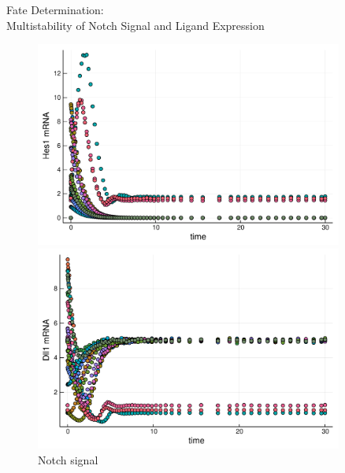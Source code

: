 \documentclass[xelatex]{beamer}
\newlength{\sepwidth}
\newlength{\colwidth}
\newcommand{\separatorcolumn}{\begin{column}{\sepwidth}\end{column}}
\begin{document}
\begin{frame}[t]
\begin{columns}[t]
\begin{column}{\colwidth}
\end{column}

\separatorcolumn

\begin{column}{\colwidth}

\begin{alertblock}{Fate Determination: \\ Multistability of Notch Signal and Ligand Expression}

	\begin{figure}
		\centering
		\footnotesize
		\begin{minipage}{0.4\textwidth}
			\includegraphics[scale=0.7]{Image/hes1_17cell_alpha-1_gamma.pdf}
			\caption{Notch signal}
		\end{minipage}
		\hspace{2.5cm}
		\begin{minipage}{0.4\textwidth}
			\includegraphics[scale=0.7]{Image/dll_17cell_alpha-1_gamma.pdf}

\end{minipage}
\end{figure}
\end{alertblock}
\end{column}
\end{columns}
\end{frame}
\end{document}
